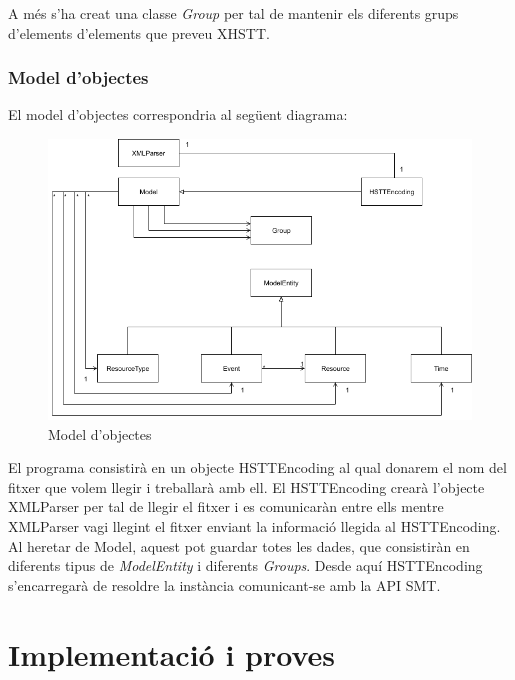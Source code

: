 \documentclass[11pt,a4paper,twoside]{report}
\begin{document}
  A més s'ha creat una classe \textit{Group} per tal de mantenir els diferents grups d'elements d'elements que preveu XHSTT.  


  \subsection{Model d'objectes}

  El model d'objectes correspondria al següent diagrama:
  \begin{figure}[H]
    \includegraphics[width=\textwidth]{Diagrames/UMLKai.png}
    \caption{Model d'objectes}
    \label{fig:ObjectModel}
  \end{figure}
  

  El programa consistirà en un objecte HSTTEncoding al qual donarem el nom del fitxer que volem llegir i treballarà amb ell. 
  El HSTTEncoding crearà l'objecte XMLParser per tal de llegir el fitxer i es comunicaràn entre ells mentre XMLParser vagi llegint el fitxer enviant la informació llegida al HSTTEncoding. 
  Al heretar de Model, aquest pot guardar totes les dades, que consistiràn en diferents tipus de \textit{ModelEntity} i diferents \textit{Groups}.
  Desde aquí HSTTEncoding s'encarregarà de resoldre la instància comunicant-se amb la API SMT.


  

  \chapter{Implementació i proves}
\end{document}
